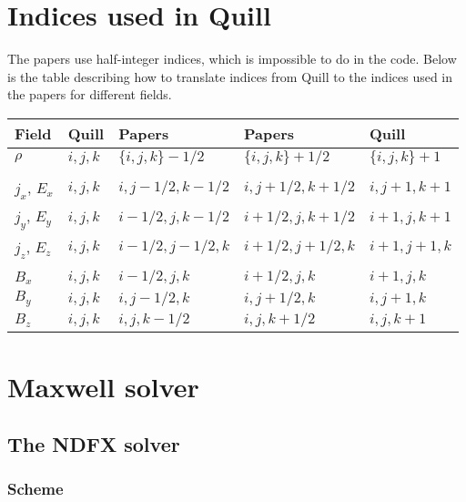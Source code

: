 \documentclass[12pt,a4paper,DIV=calc]{scrartcl}
\begin{document}
\section{Indices used in Quill}\label{sec:indices}
The papers \cite{PukhovLectures, PukhovCERN} use half-integer indices, which is impossible to do in the code.
Below is the table describing how to translate indices from Quill to the indices used in the papers for different fields.

\begin{tabular}{ l | l l | l l }
    Field & Quill &  Papers & Papers & Quill\\
    \hline
    $\rho$ & $i,j,k$ & $\lbrace i,j,k\rbrace-1/2$ & $\lbrace i,j,k\rbrace + 1/2$ & $\lbrace i,j,k\rbrace+1$ \\
    &&&&\\
    $j_x$, $E_x$ & $i,j,k$ & $i,j-1/2,k-1/2$ & $i,j+1/2,k+1/2$ & $i,j+1,k+1$ \\
    $j_y$, $E_y$ & $i,j,k$ & $i-1/2,j,k-1/2$ & $i+1/2,j,k+1/2$ & $i+1,j,k+1$ \\
    $j_z$, $E_z$ & $i,j,k$ & $i-1/2,j-1/2,k$ & $i+1/2,j+1/2,k$ & $i+1,j+1,k$ \\
    &&&&\\
    $B_x$ & $i,j,k$ & $i-1/2,j,k$ & $i+1/2,j,k$ & $i+1,j,k$\\
    $B_y$ & $i,j,k$ & $i,j-1/2,k$ & $i,j+1/2,k$ & $i,j+1,k$\\
    $B_z$ & $i,j,k$ & $i,j,k-1/2$ & $i,j,k+1/2$ & $i,j,k+1$
\end{tabular}

\section{Maxwell solver}

\subsection{The NDFX solver}

\subsubsection{Scheme}
\end{document}
